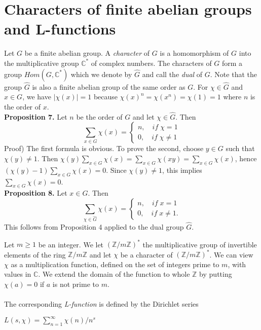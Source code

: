 \documentclass[11pt]{article}
\begin{document}
\section{Characters of finite abelian groups and L-functions}
Let $G$ be a finite abelian group. A \textit{character} of $G$ is a homomorphism of $G$ into the multiplicative group $\mathbb{C}^*$ of complex numbers. The characters of $G$ form a group $Hom(G,\mathbb{C}^*)$ which we denote by $\hat{G}$ and call the \textit{dual} of $G$. Note that the group $\hat{G}$ is also a finite abelian group of the same order as $G$. For $\chi\in\hat{G}$ and $x\in G$, we have $|\chi(x)|=1$ because $\chi(x)^n=\chi(x^n)=\chi(1)=1$ where $n$ is the order of $x$.
\vspace{5mm}
\\
\textbf{Proposition 7.}
Let $n$ be the order of $G$ and let $\chi\in\hat{G}$. Then
\begin{equation*}
    \displaystyle\sum_{x\in G} \chi(x)=\left \{\begin{array}{l}
    n,\quad if \; \chi=1 \\
    0,\quad if \; \chi\neq 1
    \end{array}
    \right.
\end{equation*}
Proof) The first formula is obvious. To prove the second, choose $y\in G$ such that $\chi(y)\neq 1$. Then $\chi(y)\displaystyle\sum_{x\in G} \chi(x)=\displaystyle\sum_{x\in G} \chi(xy)=\displaystyle\sum_{x\in G} \chi(x)$, hence $(\chi(y)-1)\displaystyle\sum_{x\in G} \chi(x)=0$. Since $\chi(y)\neq 1$, this implies $\displaystyle\sum_{x\in G} \chi(x)=0$.
\vspace{10mm}
\\
\textbf{Proposition 8.}
Let $x \in G$. Then
\begin{equation*}
    \displaystyle\sum_{\chi\in \hat{G}} \chi(x)=\left \{\begin{array}{l}
    n,\quad if \; x=1 \\
    0,\quad if \; x\neq 1.
    \end{array}
    \right.
\end{equation*}
This follows from Proposition 4 applied to the dual group $\hat{G}$.
\vspace{10mm}

Let $m\geq 1$ be an integer. We let $(\mathbb{Z}/m\mathbb{Z})^*$ the multiplicative group of invertible elements of the ring $\mathbb{Z}/m\mathbb{Z}$ and let $\chi$ be a character of $(\mathbb{Z}/m\mathbb{Z})^*$. We can view $\chi$ as a multiplication function, defined on the set of integers prime to $m$, with values in $\mathbb{C}$. We extend the domain of the function to whole $\mathbb{Z}$ by putting $\chi(a)=0$ if $a$ is not prime to $m$.
\\
\\
The corresponding \textit{L-function} is defined by the Dirichlet series
\begin{center}
    $L(s,\chi)=\displaystyle\sum_{n=1}^{\infty} \chi(n)/n^s$
\end{center}
\vspace{2mm}
\end{document}
